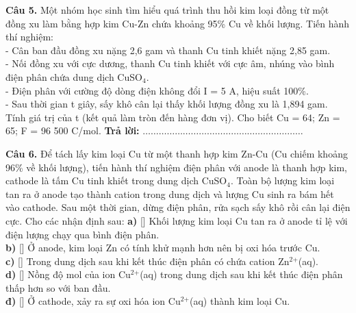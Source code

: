 \documentclass{article}
\begin{document}
\fontsize{24}{32}\selectfont
\textbf{Câu 5.} Một nhóm học sinh tìm hiểu quá trình thu hồi kim loại đồng từ một đồng xu làm bằng hợp kim Cu-Zn chứa khoảng 95\% Cu về khối lượng. Tiến hành thí nghiệm:\\ 
- Cân ban đầu đồng xu nặng 2,6 gam và thanh Cu tinh khiết nặng 2,85 gam.\\ 
- Nối đồng xu với cực dương, thanh Cu tinh khiết với cực âm, nhúng vào bình điện phân chứa dung dịch CuSO$_{\text{4}}$.\\ 
- Điện phân với cường độ dòng điện không đổi I = 5 A, hiệu suất 100\%.\\ 
- Sau thời gian t giây, sấy khô cân lại thấy khối lượng đồng xu là 1,894 gam.\\ 
Tính giá trị của t (kết quả làm tròn đến hàng đơn vị). Cho biết Cu = 64; Zn = 65; F = 96 500 C/mol.
\vspace{12pt}
\textbf{Trả lời:} $\dots\dots\dots\dots\dots\dots\dots\dots\dots\dots\dots\dots\dots\dots\dots\dots\dots\dots\dots\dots$
\vspace*{\fill}
\newpage

\fontsize{22}{29}\selectfont
\textbf{Câu 6.} Để tách lấy kim loại Cu từ một thanh hợp kim Zn-Cu (Cu chiếm khoảng 96\% về khối lượng), tiến hành thí nghiệm điện phân với anode là thanh hợp kim, cathode là tấm Cu tinh khiết trong dung dịch CuSO$_{\text{4}}$. Toàn bộ lượng kim loại tan ra ở anode tạo thành cation trong dung dịch và lượng Cu sinh ra bám hết vào cathode. Sau một thời gian, dừng điện phân, rửa sạch sấy khô rồi cân lại điện cực. Cho các nhận định sau:
\vspace{6pt}
\textbf{a)} [\quad] Khối lượng kim loại Cu tan ra ở anode tỉ lệ với điện lượng chạy qua bình điện phân.\\[4pt]
\textbf{b)} [\quad] Ở anode, kim loại Zn có tính khử mạnh hơn nên bị oxi hóa trước Cu.\\[4pt]
\textbf{c)} [\quad] Trong dung dịch sau khi kết thúc điện phân có chứa cation Zn$^{\text{2+}}$(aq).\\[4pt]
\textbf{d)} [\quad] Nồng độ mol của ion Cu$^{\text{2+}}$(aq) trong dung dịch sau khi kết thúc điện phân thấp hơn so với ban đầu.\\[4pt]
\textbf{đ)} [\quad] Ở cathode, xảy ra sự oxi hóa ion Cu$^{\text{2+}}$(aq) thành kim loại Cu.\\[4pt]
\vspace*{\fill}
\newpage
\end{document}
